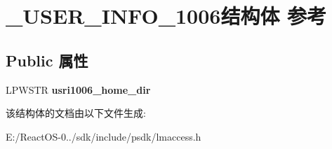 \hypertarget{struct___u_s_e_r___i_n_f_o__1006}{}\section{\+\_\+\+U\+S\+E\+R\+\_\+\+I\+N\+F\+O\+\_\+1006结构体 参考}
\label{struct___u_s_e_r___i_n_f_o__1006}
\subsection*{Public 属性}
\begin{DoxyCompactItemize}
\item 
\mbox{\label{struct___u_s_e_r___i_n_f_o__1006_ac26e87eb0272f5fae0f48225107e8610}} 
L\+P\+W\+S\+TR {\bfseries usri1006\+\_\+home\+\_\+dir}
\end{DoxyCompactItemize}


该结构体的文档由以下文件生成\+:\begin{DoxyCompactItemize}
\item 
E\+:/\+React\+O\+S-\/0../sdk/include/psdk/lmaccess.\+h\end{DoxyCompactItemize}

